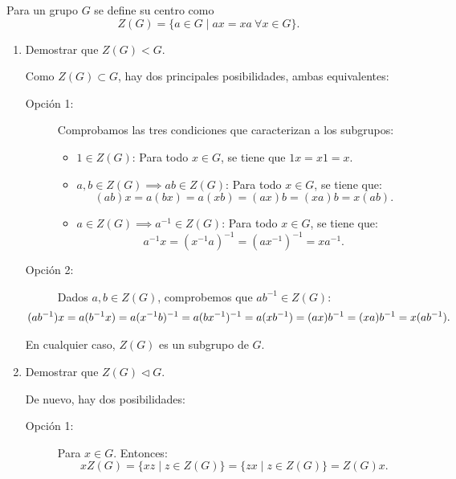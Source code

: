 \begin{ejercicio}
    Para un grupo $G$ se define su centro como
    \[
        Z(G) = \{a\in G\mid ax=xa\ \forall x\in G\}.
    \]
    \begin{enumerate}
        \item Demostrar que $Z(G)< G$.
        
        Como $Z(G)\subset G$, hay dos principales posibilidades, ambas equivalentes:
        \begin{description}
            \item[Opción 1:]
            Comprobamos las tres condiciones que caracterizan a los subgrupos:
            \begin{itemize}
                \item $1\in Z(G)$: Para todo $x\in G$, se tiene que $1x=x1=x$.
                \item $a,b\in Z(G)\implies ab\in Z(G)$: Para todo $x\in G$, se tiene que:
                \begin{equation*}
                    (ab)x = a(bx) = a(xb) = (ax)b = (xa)b = x(ab).
                \end{equation*}
                \item $a\in Z(G)\implies a^{-1}\in Z(G)$: Para todo $x\in G$, se tiene que:
                \begin{equation*}
                    a^{-1}x = (x^{-1}a)^{-1} = (ax^{-1})^{-1} = xa^{-1}.
                \end{equation*}
            \end{itemize}

            \item[Opción 2:]
            
            Dados $a,b\in Z(G)$, comprobemos que $ab^{-1}\in Z(G)$:
            \begin{align*}
                \hspace{-1cm}(ab^{-1})x &= a(b^{-1}x) = a(x^{-1}b)^{-1} = a(bx^{-1})^{-1} = a(xb^{-1}) = (ax)b^{-1} = (xa)b^{-1} = x(ab^{-1}).
            \end{align*}
        \end{description}

        En cualquier caso, $Z(G)$ es un subgrupo de $G$.
        \item Demostrar que $Z(G)\lhd G$.
        
        De nuevo, hay dos posibilidades:
        \begin{description}
            \item[Opción 1:]
            Para $x\in G$. Entonces:
            \begin{equation*}
                xZ(G) = \{xz\mid z\in Z(G)\} = \{zx\mid z\in Z(G)\} = Z(G)x.
            \end{equation*}


\end{description}
\end{enumerate}
\end{ejercicio}
